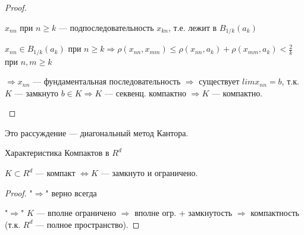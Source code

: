 \begin{theorem-non}
\begin{proof}
\begin{enumerate}
            $x_{nn}$ при $n \geqslant k$ --- подпоследовательность $x_{kn}$, т.е. лежит в $B_{1/k}(a_k)$

            $x_{nn} \in B_{1/k}(a_k)$ при $n \geqslant k \Longrightarrow \rho(x_{nn}, x_{mm}) \leqslant \rho(x_{nn}, a_k) + \rho(x_{mm}, a_k) < \frac{2}{k}$ при $n,m \geqslant k$

            $\Longrightarrow x_{nn}$ --- фундаментальная последовательность $\Longrightarrow$ существует $lim x_{nn} = b$, т.к. $K$ --- замкнуто $b \in K \Longrightarrow K$ --- секвенц. компактно $\Longrightarrow K$ --- компактно.
            
            \end{enumerate}    
    \end{proof}

\end{theorem-non}

\notice Это рассуждение --- диагональный метод Кантора.

\begin{follow}
    Характеристика Компактов в $R^d$

    $K \subset R^d$ --- компакт $\Longleftrightarrow K$ --- замкнуто и ограничено.

    \begin{proof}
        "$\Longrightarrow$" верно всегда

        "$\Longrightarrow$" $K$ --- вполне ограничено $\Longrightarrow$ вполне огр. + замкнутость $\Longrightarrow$ компактность (т.к. $R^d$ --- полное пространство).
    \end{proof}

\end{follow} 
